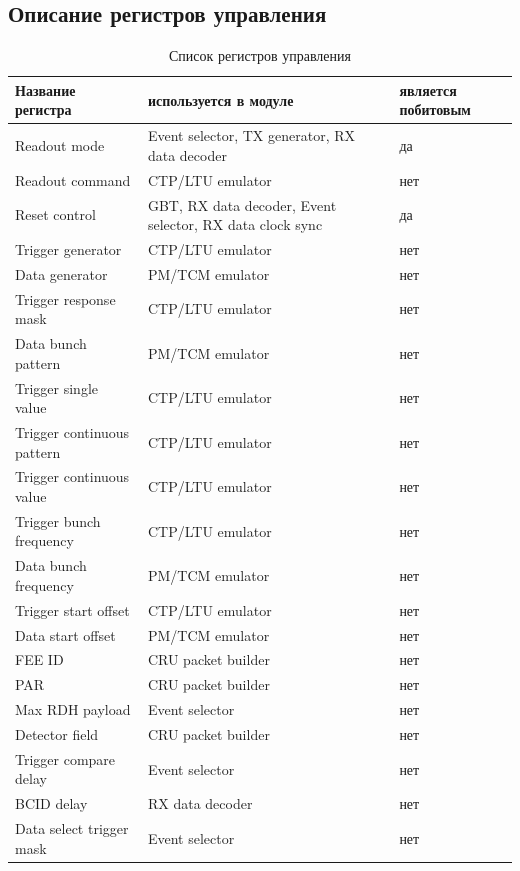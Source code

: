 \documentclass{article}
\begin{document}
\subsection{Описание регистров управления}


\begin{table}[H]
\centering
\begin{tabular}{| l | l | l |}
\hline
Название регистра & используется в модуле & является побитовым \\ \hline
Readout mode & Event selector, TX generator, RX data decoder & да \\ \hline
Readout command & CTP/LTU emulator & нет \\ \hline
Reset control & GBT, RX data decoder, Event selector, RX data clock sync & да \\ \hline
Trigger generator & CTP/LTU emulator & нет \\ \hline
Data generator & PM/TCM emulator & нет \\ \hline
Trigger response mask & CTP/LTU emulator & нет \\ \hline
Data bunch pattern & PM/TCM emulator & нет \\ \hline
Trigger single value & CTP/LTU emulator & нет \\ \hline
Trigger continuous pattern & CTP/LTU emulator & нет \\ \hline
Trigger continuous value & CTP/LTU emulator & нет \\ \hline
Trigger bunch frequency & CTP/LTU emulator & нет \\ \hline
Data bunch frequency & PM/TCM emulator & нет \\ \hline
Trigger start offset & CTP/LTU emulator & нет \\ \hline
Data start offset & PM/TCM emulator & нет \\ \hline
FEE ID & CRU packet builder & нет \\ \hline
PAR & CRU packet builder & нет \\ \hline
Max RDH payload &  Event selector & нет \\ \hline
Detector field & CRU packet builder & нет \\ \hline
Trigger compare delay &  Event selector & нет \\ \hline
BCID delay & RX data decoder & нет \\ \hline
Data select trigger mask &  Event selector & нет \\ \hline
\end{tabular}
\caption{Список регистров управления\label{tab1}}
\end{table}
\end{document}
